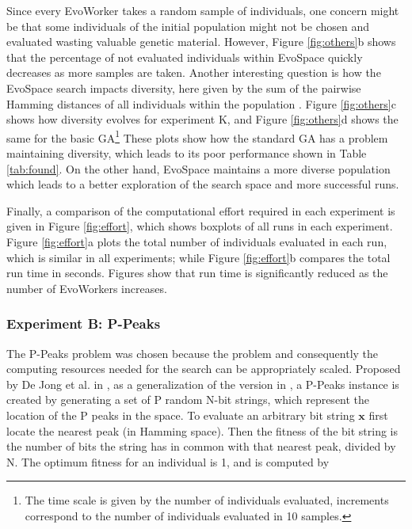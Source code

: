 Since every EvoWorker takes a random sample of individuals, one concern might be that some individuals of the initial population might
not be chosen and evaluated wasting valuable genetic material.
However, Figure \ref{fig:others}b shows that the percentage of not evaluated individuals within EvoSpace quickly decreases as more samples are taken.
Another interesting question is how the EvoSpace search impacts diversity, here given by the sum of the pairwise Hamming distances
of all individuals within the population \cite{diversity}.
Figure \ref{fig:others}c shows how diversity evolves for experiment K, and
Figure \ref{fig:others}d shows the same for the basic GA\footnote{The time scale is given by
the number of individuals evaluated, increments correspond to the number of individuals evaluated in 10 samples.}
These plots show how the standard GA has a problem maintaining diversity, which leads to its poor performance shown in Table \ref{tab:found}.
On the other hand, EvoSpace maintains a more diverse population which leads to a better exploration of the search space and more successful runs.

Finally, a comparison of the computational effort required in each experiment is given in
Figure \ref{fig:effort}, which shows boxplots of all runs in each experiment.
Figure \ref{fig:effort}a plots the total number of individuals evaluated in each run, which is similar in all experiments;
while Figure \ref{fig:effort}b compares the total run time in seconds.
Figures show that run time is significantly reduced as the number of EvoWorkers increases.



\subsubsection{Experiment B: P-Peaks}

The P-Peaks problem was chosen because the problem and consequently the computing resources needed for the search can be appropriately scaled.
Proposed by De Jong et al. in \cite{Jong:PS97}, as a generalization of the version in \cite{Jong:1990}, a
P-Peaks instance is created by generating a set of P random N-bit
strings, which represent the location of the P peaks in the space. To
evaluate an arbitrary bit string \begin{math} \mathbf{x} \end{math}
first locate the nearest peak (in Hamming space). Then the fitness of
the bit string is the number of bits the string has in common with
that nearest peak, divided by N. The optimum fitness for an individual
is 1, and is computed by

